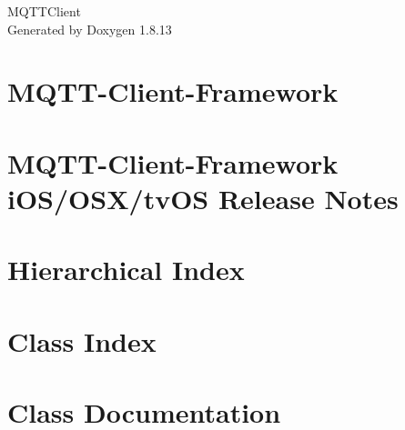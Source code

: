 \documentclass[twoside]{book}
\newcommand{\+}{\discretionary{\mbox{\scriptsize$\hookleftarrow$}}{}{}}
\newcommand{\clearemptydoublepage}{%
  \newpage{\pagestyle{empty}\cleardoublepage}%
}
\begin{document}
\hypersetup{pageanchor=false,
             bookmarksnumbered=true,
             pdfencoding=unicode
            }
\begin{titlepage}
\vspace*{7cm}
\begin{center}%
{\Large M\+Q\+T\+T\+Client }\\
\vspace*{1cm}
{\large Generated by Doxygen 1.8.13}\\
\end{center}
\end{titlepage}
\clearemptydoublepage
{}
\tableofcontents
\clearemptydoublepage
{}
\hypersetup{pageanchor=true}

\chapter{M\+Q\+T\+T-\/\+Client-\/\+Framework}
\label{index}\hypertarget{index}{}
\chapter{M\+Q\+T\+T-\/\+Client-\/\+Framework i\+O\+S/\+O\+S\+X/tv\+OS Release Notes}
\label{md___users_ckrey__m_q_t_t-_client-_framework__c_h_a_n_g_e_l_o_g}

\chapter{Hierarchical Index}

\chapter{Class Index}

\chapter{Class Documentation}





















\backmatter
\newpage
{}
\clearemptydoublepage
{}
\printindex
\end{document}
